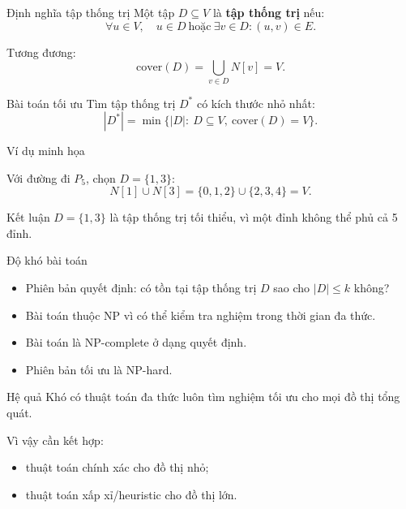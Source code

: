 \documentclass[aspectratio=169, 11pt]{beamer}
\begin{document}
\begin{frame}{Định nghĩa tập thống trị}
  Một tập $D \subseteq V$ là \textbf{tập thống trị} nếu:
  \[
    \forall u \in V,\quad u\in D \ \text{hoặc}\ \exists v\in D: (u,v)\in E.
  \]

  Tương đương:
  \[
    \mathrm{cover}(D)=\bigcup_{v\in D}N[v]=V.
  \]

  \begin{block}{Bài toán tối ưu}
    Tìm tập thống trị $D^*$ có kích thước nhỏ nhất:
    \[
      |D^*|=\min\{|D|:\ D\subseteq V,\ \mathrm{cover}(D)=V\}.
    \]
  \end{block}
\end{frame}

\begin{frame}{Ví dụ minh họa}
  \centering

  \vspace{0.5cm}
  Với đường đi $P_5$, chọn $D=\{1,3\}$:
  \[
    N[1]\cup N[3]=\{0,1,2\}\cup\{2,3,4\}=V.
  \]

  \begin{block}{Kết luận}
    $D=\{1,3\}$ là tập thống trị tối thiểu, vì một đỉnh không thể phủ cả 5 đỉnh.
  \end{block}
\end{frame}

\begin{frame}{Độ khó bài toán}
  \begin{itemize}
    \item Phiên bản quyết định: có tồn tại tập thống trị $D$ sao cho $|D|\leq k$ không?
    \item Bài toán thuộc NP vì có thể kiểm tra nghiệm trong thời gian đa thức.
    \item Bài toán là NP-complete ở dạng quyết định.
    \item Phiên bản tối ưu là NP-hard.
  \end{itemize}

  \begin{block}{Hệ quả}
    Khó có thuật toán đa thức luôn tìm nghiệm tối ưu cho mọi đồ thị tổng quát.
  \end{block}

  Vì vậy cần kết hợp:
  \begin{itemize}
    \item thuật toán chính xác cho đồ thị nhỏ;
    \item thuật toán xấp xỉ/heuristic cho đồ thị lớn.
  \end{itemize}
\end{frame}
\end{document}
